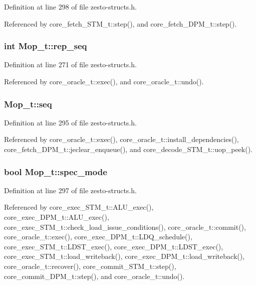 Definition at line 298 of file zesto-structs.h.

Referenced by core\_\-fetch\_\-STM\_\-t::step(), and core\_\-fetch\_\-DPM\_\-t::step().
\subsubsection[{rep\_\-seq}]{\setlength{\rightskip}{0pt plus 5cm}int {\bf Mop\_\-t::rep\_\-seq}}\label{structMop__t_4d78627f97c622df4b1a9ea232bdc5ce}




Definition at line 271 of file zesto-structs.h.

Referenced by core\_\-oracle\_\-t::exec(), and core\_\-oracle\_\-t::undo().
\subsubsection[{seq}]{ {\bf Mop\_\-t::seq}}\label{structMop__t_73a37cb3f710fed5c590d5185dd45531}




Definition at line 295 of file zesto-structs.h.

Referenced by core\_\-oracle\_\-t::exec(), core\_\-oracle\_\-t::install\_\-dependencies(), core\_\-fetch\_\-DPM\_\-t::jeclear\_\-enqueue(), and core\_\-decode\_\-STM\_\-t::uop\_\-peek().
\subsubsection[{spec\_\-mode}]{\setlength{\rightskip}{0pt plus 5cm}bool {\bf Mop\_\-t::spec\_\-mode}}\label{structMop__t_92d2861b39c23b47dd58854da3288e81}




Definition at line 297 of file zesto-structs.h.

Referenced by core\_\-exec\_\-STM\_\-t::ALU\_\-exec(), core\_\-exec\_\-DPM\_\-t::ALU\_\-exec(), core\_\-exec\_\-STM\_\-t::check\_\-load\_\-issue\_\-conditions(), core\_\-oracle\_\-t::commit(), core\_\-oracle\_\-t::exec(), core\_\-exec\_\-DPM\_\-t::LDQ\_\-schedule(), core\_\-exec\_\-STM\_\-t::LDST\_\-exec(), core\_\-exec\_\-DPM\_\-t::LDST\_\-exec(), core\_\-exec\_\-STM\_\-t::load\_\-writeback(), core\_\-exec\_\-DPM\_\-t::load\_\-writeback(), core\_\-oracle\_\-t::recover(), core\_\-commit\_\-STM\_\-t::step(), core\_\-commit\_\-DPM\_\-t::step(), and core\_\-oracle\_\-t::undo().
